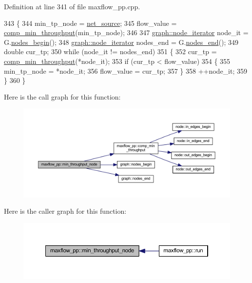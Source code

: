 Definition at line 341 of file maxflow\+\_\+pp.\+cpp.


\begin{DoxyCode}
343 \{
344     min\_tp\_node = \mbox{\hyperlink{classmaxflow__pp_a20f2d05465acc2d7b777ea8025d12003}{net\_source}};
345     flow\_value = \mbox{\hyperlink{classmaxflow__pp_ab1146e40ae2f2405e0ca6ea3ff43a6ff}{comp\_min\_throughput}}(min\_tp\_node);
346 
347     \mbox{\hyperlink{classgraph_a2cb374b84c133ce13f94e73c3e5da7fa}{graph::node\_iterator}} node\_it = G.\mbox{\hyperlink{classgraph_aec053a4b509d1be804237a80044c54c0}{nodes\_begin}}();
348     \mbox{\hyperlink{classgraph_a2cb374b84c133ce13f94e73c3e5da7fa}{graph::node\_iterator}} nodes\_end = G.\mbox{\hyperlink{classgraph_abbf9c0cb5629e98e1142254911238173}{nodes\_end}}();
349     \textcolor{keywordtype}{double} cur\_tp;
350     \textcolor{keywordflow}{while} (node\_it != nodes\_end)
351     \{
352     cur\_tp = \mbox{\hyperlink{classmaxflow__pp_ab1146e40ae2f2405e0ca6ea3ff43a6ff}{comp\_min\_throughput}}(*node\_it);
353     \textcolor{keywordflow}{if} (cur\_tp < flow\_value)
354     \{
355         min\_tp\_node = *node\_it;
356         flow\_value = cur\_tp;
357     \}
358     ++node\_it;
359     \}
360 \}
\end{DoxyCode}
Here is the call graph for this function\+:\nopagebreak
\begin{figure}[H]
\begin{center}
\leavevmode
\includegraphics[width=350pt]{classmaxflow__pp_a9f820f51329f0e0ec4d8123547ae6ebd_cgraph}
\end{center}
\end{figure}
Here is the caller graph for this function\+:\nopagebreak
\begin{figure}[H]
\begin{center}
\leavevmode
\includegraphics[width=350pt]{classmaxflow__pp_a9f820f51329f0e0ec4d8123547ae6ebd_icgraph}
\end{center}
\end{figure}
\mbox{\label{classmaxflow__pp_a7a738741f8050df0cb0be0381aef0825}} 
